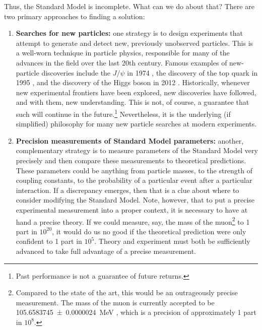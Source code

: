 \documentclass[../thesis.tex]{subfiles}
\begin{document}
	Thus, the Standard Model is incomplete. What can we do about that? There are two primary approaches to finding a solution:
	\begin{enumerate}
		\item \textbf{Searches for new particles:} one strategy is to design experiments that attempt to generate and detect new, previously unobserved particles. This is a well-worn technique in particle physics, responsible for many of the advances in the field over the last 20th century. Famous examples of new-particle discoveries include the $J/\psi$ in 1974 \cite{aubert_experimental_1974,augustin_discovery_1974}, the discovery of the top quark in 1995 \cite{d0_collaboration_observation_1995,cdf_collaboration_observation_1995}, and the discovery of the Higgs boson in 2012 \cite{atlas_collaboration_observation_2012,cms_collaboration_observation_2012}. Historically, whenever new experimental frontiers have been explored, new discoveries have followed, and with them, new understanding. This is not, of course, a guarantee that such will continue in the future.\footnote{Past performance is not a guarantee of future returns.} Nevertheless, it is the underlying (if simplified) philosophy for many new particle searches at modern experiments.

		\item \textbf{Precision measurements of Standard Model parameters:} another, complementary strategy is to measure parameters of the Standard Model very precisely and then compare these measurements to theoretical predictions. These parameters could be anything from particle masses, to the strength of coupling constants, to the probability of a particular event after a particular interaction. If a discrepancy emerges, then that is a clue about where to consider modifying the Standard Model. Note, however, that to put a precise experimental measurement into a proper context, it is necessary to have at hand a precise theory. If we could measure, say, the mass of the muon\footnote{Compared to the state of the art, this would be an outrageously precise measurement. The mass of the muon is currently accepted to be \SI{105.6583745(24)}{\mega\electronvolt} \cite{particle_data_group_review_2020}, which is a precision of approximately 1 part in $10^{8}$.} to 1 part in $10^{20}$, it would do us no good if the theoretical prediction were only confident to 1 part in $10^5$. Theory and experiment must both be sufficiently advanced to take full advantage of a precise measurement.
	\end{enumerate}
\end{document}
